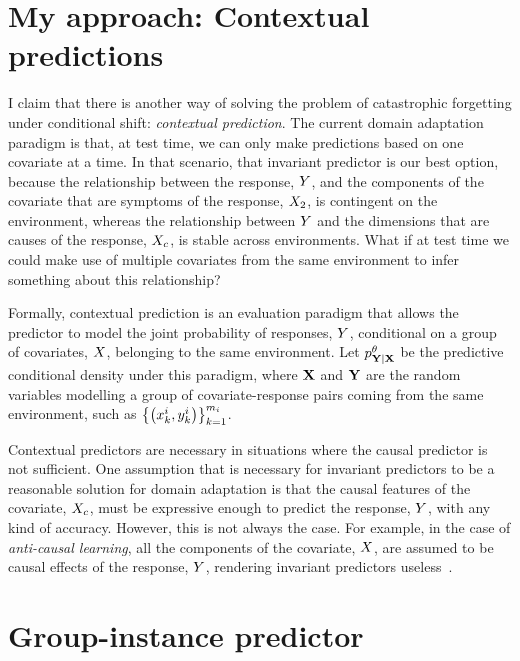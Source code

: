 \documentclass[../thesis.tex]{subfiles}
\begin{document}
\section{My approach: Contextual predictions}

I claim that there is another way of solving the problem of catastrophic forgetting under conditional shift: \textit{contextual prediction}. The current domain adaptation paradigm is that, at test time, we can only make predictions based on one covariate at a time. In that scenario, that invariant predictor is our best option, because the relationship between the response, $\myrv{y}$, and the components of the covariate that are symptoms of the response, $\myrv{x}_{2}$, is contingent on the environment, whereas the relationship between $\myrv{y}$ and the dimensions that are causes of the response, $\myrv{x}_{c}$, is stable across environments. What if at test time we could make use of multiple covariates from the same environment to infer something about this relationship? 

Formally, contextual prediction is an evaluation paradigm that allows the predictor to model the joint probability of responses, $\myrv{y}$, conditional on a group of covariates, $\myrv{x}$, belonging to the same environment. Let $\myfunc{p}^\theta_{\mygroup{\myrv{y}} | \mygroup{\myrv{x}}}$ be the predictive conditional density under this paradigm, where $\mygroup{\myrv{x}}$ and $\mygroup{\myrv{y}}$ are the random variables modelling a group of covariate-response pairs coming from the same environment, such as $\left\{ \left( x^i_k, y^i_k \right) \right\}_{k=1}^{m_i}$.

Contextual predictors are necessary in situations where the causal predictor is not sufficient. One assumption that is necessary for invariant predictors to be a reasonable solution for domain adaptation is that the causal features of the covariate, $\myrv{x}_{c}$, must be expressive enough to predict the response, $\myrv{y}$, with any kind of accuracy. However, this is not always the case. For example, in the case of \textit{anti-causal learning}, all the components of the covariate, $\myrv{x}$, are assumed to be causal effects of the response, $\myrv{y}$, rendering invariant predictors useless~\citep{scholkopfCausalAnticausalLearning2012}.

\section{Group-instance predictor}
\end{document}
